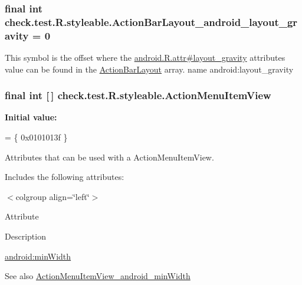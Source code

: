 \subsubsection[{Action\+Bar\+Layout\+\_\+android\+\_\+layout\+\_\+gravity}]{\setlength{\rightskip}{0pt plus 5cm}final int check.\+test.\+R.\+styleable.\+Action\+Bar\+Layout\+\_\+android\+\_\+layout\+\_\+gravity = 0\hspace{0.3cm}{\ttfamily [static]}}\label{classcheck_1_1test_1_1_r_1_1styleable_a3612dfcddc55dfc324a442784c10f411}
This symbol is the offset where the \hyperlink{}{android.\+R.\+attr\#layout\+\_\+gravity} attribute\textquotesingle{}s value can be found in the \hyperlink{classcheck_1_1test_1_1_r_1_1styleable_a8971aa624f5e375a92c516f616a8e96f}{Action\+Bar\+Layout} array.  name android\+:layout\+\_\+gravity \hypertarget{classcheck_1_1test_1_1_r_1_1styleable_af9bcde1ea657ba5e365b9244857ff747}{}
\subsubsection[{Action\+Menu\+Item\+View}]{\setlength{\rightskip}{0pt plus 5cm}final int \mbox{[}$\,$\mbox{]} check.\+test.\+R.\+styleable.\+Action\+Menu\+Item\+View\hspace{0.3cm}{\ttfamily [static]}}\label{classcheck_1_1test_1_1_r_1_1styleable_af9bcde1ea657ba5e365b9244857ff747}
{\bfseries Initial value\+:}
\begin{DoxyCode}
= \{
            0x0101013f
        \}
\end{DoxyCode}
Attributes that can be used with a Action\+Menu\+Item\+View. 

Includes the following attributes\+:

\begin{TabularC}{0}
\hline
\end{TabularC}
$<$colgroup align=\char`\"{}left\char`\"{}$>$ 

Attribute

Description 

{\ttfamily \hyperlink{classcheck_1_1test_1_1_r_1_1styleable_a87c981bf978b7f6f0732aa8d94620c0e}{android\+:min\+Width}}

\begin{DoxySeeAlso}{See also}
\hyperlink{classcheck_1_1test_1_1_r_1_1styleable_a87c981bf978b7f6f0732aa8d94620c0e}{Action\+Menu\+Item\+View\+\_\+android\+\_\+min\+Width} 
\end{DoxySeeAlso}
\hypertarget{classcheck_1_1test_1_1_r_1_1styleable_a87c981bf978b7f6f0732aa8d94620c0e}{}
